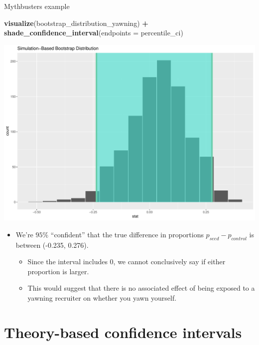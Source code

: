 \documentclass[
  ignorenonframetext,
]{beamer}
\newenvironment{Shaded}{\begin{snugshade}}{\end{snugshade}}
\newcommand{\AttributeTok}[1]{\textcolor[rgb]{0.13,0.29,0.53}{#1}}
\newcommand{\FunctionTok}[1]{\textcolor[rgb]{0.13,0.29,0.53}{\textbf{#1}}}
\newcommand{\NormalTok}[1]{#1}
\newcommand{\SpecialCharTok}[1]{\textcolor[rgb]{0.81,0.36,0.00}{\textbf{#1}}}
\providecommand{\tightlist}{%
  \setlength{\itemsep}{0pt}\setlength{\parskip}{0pt}}
\begin{document}
\begin{frame}[fragile]{Mythbusters example}
\protect\hypertarget{mythbusters-example-5}{}
\tiny

\begin{Shaded}
\begin{Highlighting}[]
\FunctionTok{visualize}\NormalTok{(bootstrap\_distribution\_yawning) }\SpecialCharTok{+}
\FunctionTok{shade\_confidence\_interval}\NormalTok{(}\AttributeTok{endpoints =}\NormalTok{ percentile\_ci)}
\end{Highlighting}
\end{Shaded}

\begin{center}\includegraphics[width=0.6\linewidth,height=0.4\textheight]{Week10A_files/figure-beamer/unnamed-chunk-45-1} \end{center}
\normalsize

\begin{itemize}
\item
  We're \(95\%\) ``confident'' that the true difference in proportions
  \(p_{seed}-p_{control}\) is between (-0.235, 0.276).

  \begin{itemize}
  \tightlist
  \item
    Since the interval includes 0, we cannot conclusively say if either
    proportion is larger.
  \item
    This would suggest that there is no associated effect of being
    exposed to a yawning recruiter on whether you yawn yourself.
  \end{itemize}
\end{itemize}
\end{frame}

\hypertarget{theory-based-confidence-intervals}{%
\section{Theory-based confidence
intervals}\label{theory-based-confidence-intervals}}
\end{document}
